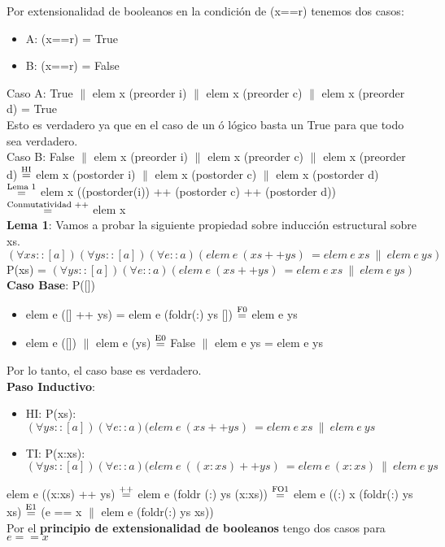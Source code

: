 \documentclass{article}
\begin{document}
Por extensionalidad de booleanos en la condición de (x==r) tenemos dos casos:
\begin{itemize}
\item A: (x==r) = True 
\item B: (x==r) = False
\end{itemize}
Caso A: True $\|$ elem x (preorder i) $\|$ elem x (preorder c) $\|$ elem x (preorder d) = True \\
Esto es verdadero ya que en el caso de un ó lógico basta un True para que todo sea verdadero.  \\  
Caso B: False $\|$ elem x (preorder i) $\|$ elem x (preorder c) $\|$ elem x (preorder d) $\stackrel{\text{HI}}{=}$ elem x (postorder i) $\|$ elem x (postorder c)  $\|$ elem x (postorder d) \\ 
$\stackrel{\text{Lema 1}}{=}$ elem x ((postorder(i)) ++ (postorder c) ++ (postorder d))
$\stackrel{\text{Conmutatividad ++}}{=}$ elem x \\
\textbf{Lema 1}: Vamos a probar la siguiente propiedad sobre inducción estructural sobre xs. \\
$(\forall xs :: [a])(\forall ys :: [a])(\forall e::a)(elem \ e \ (xs++ys) \ = elem \ e \ xs \ \| \ elem \ e \ ys)$ \\
P(xs) = $(\forall ys :: [a])(\forall e::a)(elem \ e \ (xs++ys) \ = elem \ e \ xs \ \| \ elem \ e \ ys)$ \\
\textbf{Caso Base}: P([])
\begin{itemize}
    \item elem e ([] ++ ys) = elem e (foldr(:) ys []) $\stackrel{\text{F0}}{=}$ elem e ys
    \item elem e ([]) $\|$ elem e (ys) $\stackrel{\text{E0}}{=}$ False $\|$ elem e ys = elem e ys
\end{itemize}
Por lo tanto, el caso base es verdadero. \\
\textbf{Paso Inductivo}: 
\begin{itemize}
    \item HI: P(xs): $(\forall ys :: [a])(\forall e::a)(elem \ e \ (xs++ys) \ = elem \ e \ xs \ \| \ elem \ e \ ys$
    \item TI: P(x:xs): $(\forall ys :: [a])(\forall e::a)(elem \ e \ ((x:xs)++ys) \ = elem \ e \ (x:xs) \ \| \ elem \ e \ ys$
\end{itemize}
elem e ((x:xs) ++ ys) $\stackrel{\text{++}}{=}$ elem e (foldr (:) ys (x:xs)) $\stackrel{\text{FO1}}{=}$ elem e ((:) x (foldr(:) ys xs) $\stackrel{\text{E1}}{=}$ (e == x $\|$ elem e (foldr(:) ys xs)) \\
Por el \textbf{principio de extensionalidad de booleanos} tengo dos casos para $e==x$
\end{document}
